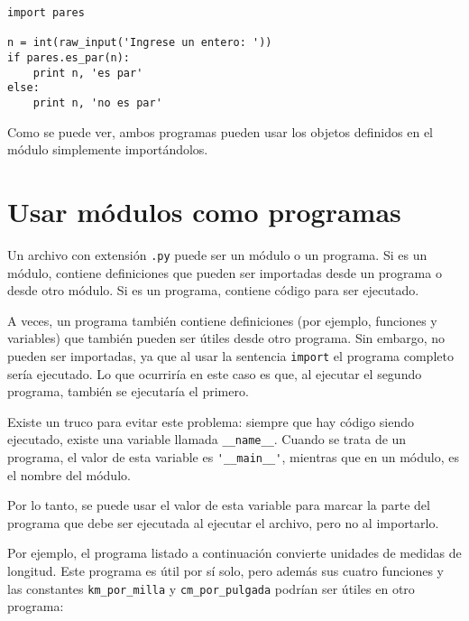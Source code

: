 \begin{lstlisting}
import pares

n = int(raw_input('Ingrese un entero: '))
if pares.es_par(n):
    print n, 'es par'
else:
    print n, 'no es par'
\end{lstlisting}

Como se puede ver, ambos programas pueden usar los objetos definidos en
el módulo simplemente importándolos.

\section{Usar módulos como programas}

Un archivo con extensión \lstinline!.py! puede ser un módulo o un
programa. Si es un módulo, contiene definiciones que pueden ser
importadas desde un programa o desde otro módulo. Si es un programa,
contiene código para ser ejecutado.

A veces, un programa también contiene definiciones (por ejemplo,
funciones y variables) que también pueden ser útiles desde otro
programa. Sin embargo, no pueden ser importadas, ya que al usar la
sentencia \lstinline!import! el programa completo sería ejecutado. Lo
que ocurriría en este caso es que, al ejecutar el segundo programa,
también se ejecutaría el primero.

Existe un truco para evitar este problema: siempre que hay código siendo
ejecutado, existe una variable llamada \lstinline!__name__!. Cuando se
trata de un programa, el valor de esta variable es
\lstinline!'__main__'!, mientras que en un módulo, es el nombre del
módulo.

Por lo tanto, se puede usar el valor de esta variable para marcar la
parte del programa que debe ser ejecutada al ejecutar el archivo, pero
no al importarlo.

Por ejemplo, el programa listado a continuación
convierte unidades de medidas de longitud.
Este programa es útil por sí solo, pero además sus cuatro funciones y
las constantes \lstinline!km_por_milla! y \lstinline!cm_por_pulgada!
podrían ser útiles en otro programa:

